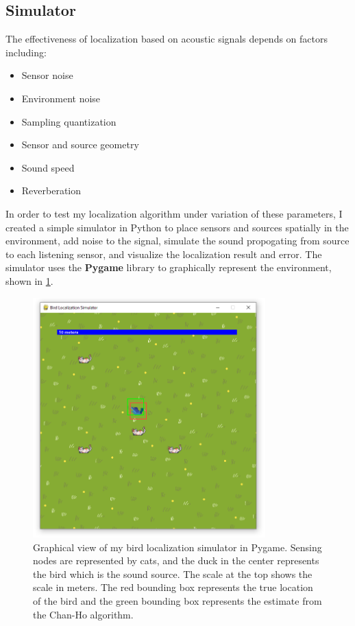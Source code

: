 \documentclass[12pt]{article}
\begin{document}
\subsection{Simulator}
	The effectiveness of localization based on acoustic signals depends on factors including:
	
\begin{itemize}
  \item Sensor noise
  \item Environment noise
  \item Sampling quantization
  \item Sensor and source geometry
  \item Sound speed
  \item Reverberation
\end{itemize}

	In order to test my localization algorithm under variation of these parameters, I created a simple simulator in Python to place sensors and sources spatially in the environment, add noise to the signal, simulate the sound propogating from source to each listening sensor, and visualize the localization result and error. The simulator uses the \textbf{Pygame} library to graphically represent the environment, shown in \ref{fig:simulator}.
	
\begin{figure}[h]
\centering
\includegraphics[width=0.8\textwidth]{simulator.png} %
\caption{Graphical view of my bird localization simulator in Pygame. Sensing nodes are represented by cats, and the duck in the center represents the bird which is the sound source. The scale at the top shows the scale in meters. The red bounding box represents the true location of the bird and the green bounding box represents the estimate from the Chan-Ho algorithm.}
\label{fig:simulator}
\end{figure}
\end{document}
